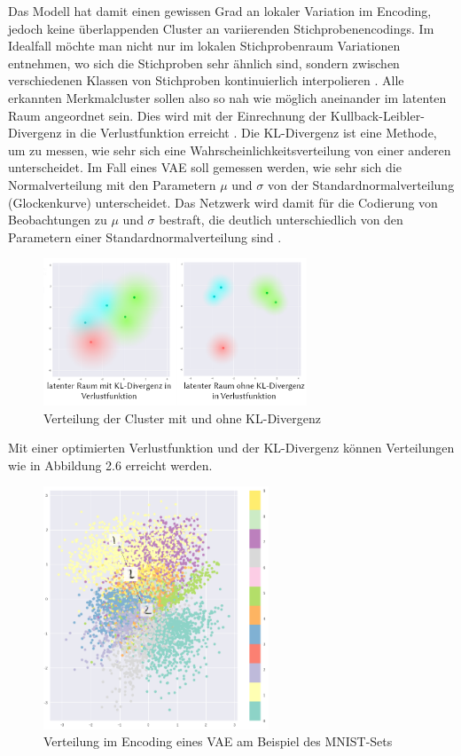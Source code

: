 \FloatBarrier
Das Modell hat damit einen gewissen Grad an lokaler Variation im Encoding, jedoch keine überlappenden Cluster an variierenden Stichprobenencodings. Im Idealfall möchte man nicht nur im lokalen Stichprobenraum Variationen entnehmen, wo sich die Stichproben sehr ähnlich sind, sondern zwischen verschiedenen Klassen von Stichproben kontinuierlich interpolieren \cite{doe16}. Alle erkannten Merkmalcluster sollen also so nah wie möglich aneinander im latenten Raum angeordnet sein. Dies wird mit der Einrechnung der Kullback-Leibler-Divergenz in die Verlustfunktion erreicht \cite{sha18}. Die KL-Divergenz ist eine Methode, um zu messen, wie sehr sich eine Wahrscheinlichkeitsverteilung von einer anderen unterscheidet. Im Fall eines VAE soll gemessen werden, wie sehr sich die Normalverteilung mit den Parametern $\mu$ und $\sigma$ von der Standardnormalverteilung (Glockenkurve) unterscheidet. Das Netzwerk wird damit für die Codierung von Beobachtungen zu $\mu$ und $\sigma$ bestraft, die deutlich unterschiedlich von den Parametern einer Standardnormalverteilung sind \cite[S.102]{fos19}.
\begin{figure}[H]
    \centering
    \includegraphics[width=0.7\textwidth,angle=0]{abb/VAE_KLL}
    \caption[Verteilung der Cluster mit und ohne KL-Divergenz]{Verteilung der Cluster mit und ohne KL-Divergenz \cite{sha18}}
\end{figure}
Mit einer optimierten Verlustfunktion und der KL-Divergenz können Verteilungen wie in Abbildung 2.6 erreicht werden.
\begin{figure}[H]
    \centering
    \includegraphics[width=0.6\textwidth,angle=0]{abb/vae_final.png}
    \caption[Verteilung im Encoding eines VAE]{Verteilung im Encoding eines VAE am Beispiel des MNIST-Sets \cite{sha18}}
\end{figure}


